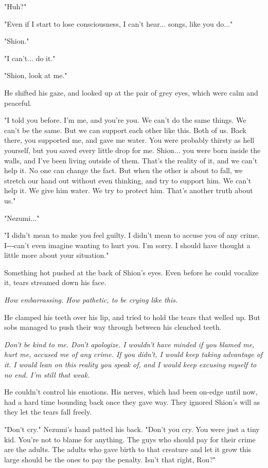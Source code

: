 "Huh?"

"Even if I start to lose consciousness, I can't hear... songs, like you
do..."

"Shion."

"I can't... do it."

"Shion, look at me."

He shifted his gaze, and looked up at the pair of grey eyes, which were
calm and peaceful.

"I told you before. I'm me, and you're you. We can't do the same things.
We can't be the same. But we can support each other like this. Both of
us. Back there, you supported me, and gave me water. You were probably
thirsty as hell yourself, but you saved every little drop for me.
Shion... you were born inside the walls, and I've been living outside of
them. That's the reality of it, and we can't help it. No one can change
the fact. But when the other is about to fall, we stretch our hand out
without even thinking, and try to support him. We can't help it. We give
him water. We try to protect him. That's another truth about us."

"Nezumi..."

"I didn't mean to make you feel guilty. I didn't mean to accuse you of
any crime. I―can't even imagine wanting to hurt you. I'm sorry. I should
have thought a little more about your situation."

Something hot pushed at the back of Shion's eyes. Even before he could
vocalize it, tears streamed down his face.

\emph{How embarrassing. How pathetic, to be crying like this.}

He clamped his teeth over his lip, and tried to hold the tears that
welled up. But sobs managed to push their way through between his
clenched teeth.

\emph{Don't be kind to me. Don't apologize. I wouldn't have minded if you
blamed me, hurt me, accused me of any crime. If you didn't, I would keep
taking advantage of it. I would lean on this reality you speak of, and I
would keep excusing myself to no end. I'm still that weak.}

He couldn't control his emotions. His nerves, which had been on-edge
until now, had a hard time bounding back once they gave way. They
ignored Shion's will as they let the tears fall freely.

"Don't cry." Nezumi's hand patted his back. "Don't you cry. You were
just a tiny kid. You're not to blame for anything. The guys who should
pay for their crime are the adults. The adults who gave birth to that
creature and let it grow this large should be the ones to pay the
penalty. Isn't that right, Rou?"

